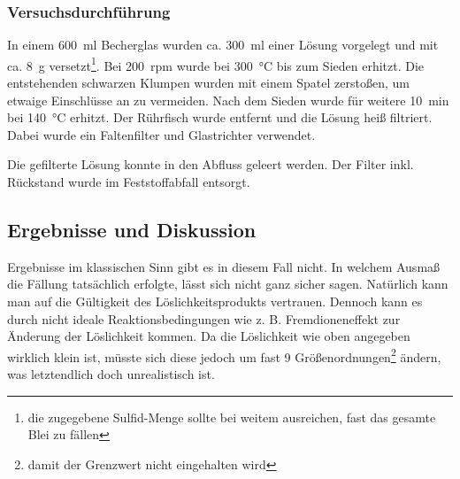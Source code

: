 \documentclass{article}
\begin{document}
        \subsubsection{Versuchsdurchführung}
        
         In einem \SI[mode=text]{600}{\milli\litre} Becherglas wurden ca. \SI[mode=text]{300}{\milli\litre} einer  Lösung vorgelegt und mit ca. \SI[mode=text]{8}{\gram}  versetzt\footnote{die zugegebene Sulfid-Menge sollte bei weitem ausreichen, fast das gesamte Blei zu fällen}. Bei \SI[mode=text]{200}{rpm} wurde bei \SI[mode=text]{300}{\degreeCelsius} bis zum Sieden erhitzt. Die entstehenden schwarzen Klumpen wurden mit einem Spatel zerstoßen, um etwaige Einschlüsse an  zu vermeiden. Nach dem Sieden wurde für weitere \SI[mode=text]{10}{\minute} bei \SI[mode=text]{140}{\degreeCelsius} erhitzt. Der Rührfisch wurde entfernt und die Lösung heiß filtriert. Dabei wurde ein Faltenfilter und Glastrichter verwendet.
         
         Die gefilterte Lösung konnte in den Abfluss geleert werden. Der Filter inkl.  Rückstand wurde im Feststoffabfall entsorgt. 
         
       \subsection{Ergebnisse und Diskussion}
       
         Ergebnisse im klassischen Sinn gibt es in diesem Fall nicht. In welchem Ausmaß die Fällung tatsächlich erfolgte, lässt sich nicht ganz sicher sagen. Natürlich kann man auf die Gültigkeit des Löslichkeitsprodukts vertrauen. Dennoch kann es durch nicht ideale Reaktionsbedingungen wie z. B. Fremdioneneffekt zur Änderung der Löslichkeit kommen. Da die Löslichkeit wie oben angegeben wirklich klein ist, müsste sich diese jedoch um fast 9 Größenordnungen\footnote{damit der Grenzwert nicht eingehalten wird} ändern, was letztendlich doch unrealistisch ist. 
  \pagebreak
  
  \listofreactions
  \printbibliography[title=Literaturverzeichnis]
  \listoffigures
  \listoftables
  
\end{document}
